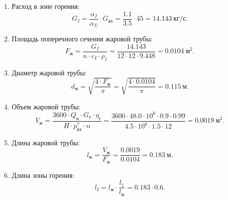 \documentclass[a4paper,10pt]{article}
\begin{document}
\begin{enumerate}
    	\item Расход в зоне горения:
    	\[
    		G_I = \frac{ \alpha_I }{ \alpha_\Sigma} \cdot G_{вх} = \frac{1.1}{3.5} 
    		\cdot 45 = 14.143\ кг/с.
    	\]

    	\item Площадь поперечного сечения жаровой трубы:
    	\[
    		F_ж = \frac{ G_I }{n \cdot c_I \cdot \rho_I} = 
    		\frac{
    			14.143
    			}{
    			12 \cdot 12 \cdot 9.448
    		} = 0.0104\ м^2.
    	\]

    	\item Диаметр жаровой трубы:
    	\[
    		d_ж = \sqrt{ \frac{4 \cdot F_ж}{ \pi } } = \sqrt{\frac{4 \cdot 0.0104}{ \pi }} =
    		0.115\ м.
    	\]

    	\item Объем жаровой трубы:
    	\[
    		V_ж = \frac{3600 \cdot Q_н \cdot G_т \cdot \eta_г}{H \cdot p_{вх}^* \cdot n} = 
    		\frac{
    			3600 \cdot 48.0 \cdot 10^6 \cdot 0.9 \cdot 0.99
    				}{
    			4.5 \cdot 10^6 \cdot 1.5 \cdot 12
    		} = 
    		0.0019\ м^3.
    	\]

    	\item Длина жаровой трубы:
    	\[
    		l_ж = \frac{V_ж}{F_ж} = \frac{0.0019}{0.0104} =
    		0.183\ м.
    	\]

    	\item Длина зоны горения:
    	\[
    		l_I = l_ж \cdot \frac{l_1}{l_ж} = 0.183 \cdot 0.6.
    	\]

     \end{enumerate}
    
\end{document}
